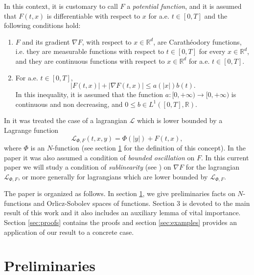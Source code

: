 \documentclass[twoside]{elsarticle}
\makeatletter
\theoremstyle{remark}
\newcommand{\labitem}[2]{%
\def\@itemlabel{\textbf{#1}}
\item
\def\@currentlabel{#1}\label{#2}}
\newcommand{\rr}{\mathbb{R}}
\renewcommand{\leq}{\leqslant}
\newcounter{example}
\makeatother
\begin{document}
In this context, it  is customary to call $F$ a  \emph{potential function}, and it is assumed that $F(t,x)$ is differentiable with respect to $x$ for a.e. $t\in [0,T]$ and the following conditions hold:
\begin{enumerate}
\labitem{(C)}{item:condicion_c} $F$ and its gradient $\nabla F$, with respect to $x\in\rr^d$,  are  Carath\'eodory functions, i.e. they are measurable functions with respect to $t\in [0,T]$ for every  $x\in\rr^d$, and they are continuous functions with  respect to  $x\in\rr^d$ for a.e. $t \in [0,T]$.
 \labitem{(A)}{item:condicion_a}  For   a.e. $t\in [0,T]$, 
\begin{equation}
|F(t,x)| + |\nabla F(t,x)|  \leq a(|x|)b(t).
\end{equation}
In this inequality, it is assumed that the function  $a:[0,+\infty)\to [0,+\infty)$ is continuous and non decreasing, 
and $0\leq b\in L^1([0,T],\rr)$.
\end{enumerate}


In \cite{ABGMS2015} it was treated  the case of a lagrangian $\mathcal{L}$ which is lower bounded by a Lagrange function
\begin{equation}\label{eq:lagrange_phi}
\mathcal{L}_{\Phi,F}(t,x,y)=\Phi(|y|)+F(t,x),
\end{equation}
where  $\Phi$ is an $N$-function (see section \ref{preliminares} for the definition of this concept).  
In the paper \cite{ABGMS2015} it was also assumed  a condition of \emph{bounded oscillation} on $F$. 
In this current paper we will study a condition of \emph{sublinearity} (see  \cite{tang1998periodic,wu1999periodic,zhao2004periodic,tang2010periodic,zhao2005existence}) on $\nabla F$ for the lagrangian  $\mathcal{L}_{\Phi,F}$, or more generally for lagrangians which are lower bounded by $\mathcal{L}_{\Phi,F}$.




The paper is organized as follows. In section \ref{preliminares}, we give preliminaries facts on $N$-functions and Orlicz-Sobolev spaces of functions. Section 3 is devoted to the main result of this work and it also includes an auxiliary lemma of vital importance. Section \ref{sec:proofs} contains the proofs and section \ref{sec:examples} provides an application of our result to a concrete case.
 

\section{Preliminaries}\label{preliminares}
\end{document}
